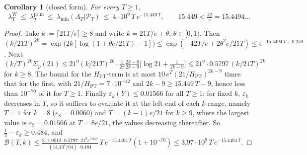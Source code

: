 \documentclass[11pt]{amsart}
\newtheorem{corollary}[theorem]{Corollary}
\theoremstyle{definition}
\theoremstyle{remark}
\newcommand{\PT}{\mathcal P_T}
\newcommand{\lamP}{\lambda^{\mathrm{prim}}_T}
\newcommand{\lamW}{\lambda^{\mathrm W}_T}
\newcommand{\lamA}{\lambda_{\min}(A_T|\PT)}
\begin{document}
\begin{corollary}[closed form]\label{cor:margin1}
For every $T\ge1$,
\begin{equation}\label{eq:closedmargin}
\lamW\ \le\ \lamP\ \le\ \lamA\ \le\ 4\cdot10^9\,T\,e^{-15.449\,T},\qquad 15.449<\tfrac{42}e=15.4494\ldots
\end{equation}
\end{corollary}
\begin{proof}
Take $k:=\lceil21T/e\rceil\ge8$ and write $k=21T/e+\theta$, $\theta\in[0,1)$. Then
$(k/21T)^{2k}=\exp\big(2k[\log(1+\theta e/21T)-1]\big)\le\exp(-42T/e+2\theta^2e/21T)\le e^{-15.4494\,T+0.259}$.
Next $(k/T)^{2k}\Sigma_p(21)\le21^9(k/21T)^{2k}\cdot\frac1{2\pi}\frac{2k-8}{2k-9}\big[\log21+\frac1{2k-9}\big]\le21^9\cdot0.5797\,(k/21T)^{2k}$
for $k\ge8$. The bound for the $H_{\mathrm{PT}}$-term is at most $10\,e^T(21/H_{\mathrm{PT}})^{2k-9}$ times that for the first, with
$21/H_{\mathrm{PT}}=7\cdot10^{-12}$ and $2k-9\ge15.449\,T-9$, hence less than $10^{-70}$ of it for $T\ge1$.
Finally $\varepsilon_k(Y)\le0.01566$ for all $T\ge1$: for fixed $k$, $\varepsilon_k$ decreases in $T$, so it
suffices to evaluate it at the left end of each $k$-range, namely $T=1$ for $k=8$ ($\varepsilon_8=0.0060$)
and $T=(k-1)e/21$ for $k\ge9$, where the largest value is $\varepsilon_9=0.01566$ at $T=8e/21$, the values
decreasing thereafter. So $\frac12-\varepsilon_k\ge0.484$, and
$\mathcal B(T,k)\le\frac{2\cdot1.0012\cdot0.5797\cdot21^9e^{0.259}}{(14.13^4/64)\cdot0.484}\,T\,e^{-15.4494\,T}(1+10^{-70})
\le3.97\cdot10^9\,T\,e^{-15.4494\,T}$.
\end{proof}
\end{document}
